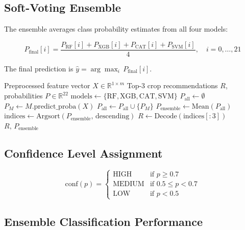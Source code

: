 \documentclass[conference]{IEEEtran}
\begin{document}
\subsection{Soft-Voting Ensemble}

The ensemble averages class probability estimates from all four models:

\begin{equation}
  P_{\mathrm{final}}[i] = \frac{P_{\mathrm{RF}}[i] + P_{\mathrm{XGB}}[i] +
  P_{\mathrm{CAT}}[i] + P_{\mathrm{SVM}}[i]}{4}, \quad i = 0,\ldots,21
  \label{eq:softvote}
\end{equation}

The final prediction is $\hat{y} = \arg\max_i\, P_{\mathrm{final}}[i]$.

\begin{algorithm}[htbp]
\caption{Soft-Voting Ensemble Classifier}
\label{alg:ensemble}
\begin{algorithmic}[1]
\Require Preprocessed feature vector $X \in \mathbb{R}^{1 \times m}$
\Ensure Top-3 crop recommendations $R$, probabilities $P \in \mathbb{R}^{22}$
\State $\mathrm{models} \gets \{\mathrm{RF}, \mathrm{XGB}, \mathrm{CAT}, \mathrm{SVM}\}$
\State $P_{\mathrm{all}} \gets \emptyset$
  \State $P_M \gets M.\mathrm{predict\_proba}(X)$
  \State $P_{\mathrm{all}} \gets P_{\mathrm{all}} \cup \{P_M\}$
\EndFor
\State $P_{\mathrm{ensemble}} \gets \mathrm{Mean}(P_{\mathrm{all}})$
\State $\mathrm{indices} \gets \mathrm{Argsort}(P_{\mathrm{ensemble}},\, \mathrm{descending})$
\State $R \gets \mathrm{Decode}(\mathrm{indices}[{:}3])$
\State \Return $R,\, P_{\mathrm{ensemble}}$
\end{algorithmic}
\end{algorithm}

\subsection{Confidence Level Assignment}

\begin{equation}
  \mathrm{conf}(p) =
  \begin{cases}
    \text{HIGH}   & \text{if } p \geq 0.7 \\
    \text{MEDIUM} & \text{if } 0.5 \leq p < 0.7 \\
    \text{LOW}    & \text{if } p < 0.5
  \end{cases}
  \label{eq:confidence}
\end{equation}

\subsection{Ensemble Classification Performance}
\end{document}
